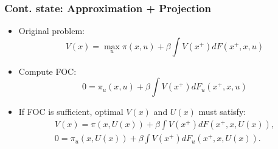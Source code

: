 \documentclass[bigger,handout]{beamer}
\begin{document}
\begin{frame}%
\frametitle{Cont. state: Approximation + Projection}

\begin{itemize}
\item Original problem:%
\begin{equation*}
V(x)=\max_{u}\pi (x,u)+\beta \int V(x^{+})dF(x^{+},x,u)
\end{equation*}

\item Compute FOC:%
\begin{equation*}
0=\pi _{u}(x,u)+\beta \int V(x^{+})dF_{u}(x^{+},x,u)
\end{equation*}

\item If FOC is sufficient, optimal $V(x)$ and $U(x)$ must satisfy:
\begin{gather*}
V(x)=\pi (x,U(x))+\beta \int V(x^{+})dF(x^{+},x,U(x)), \\
0=\pi _{u}(x,U(x))+\beta \int V(x^{+})dF_{u}(x^{+},x,U(x)).
\end{gather*}
\end{itemize}

\end{frame}%
\end{document}
